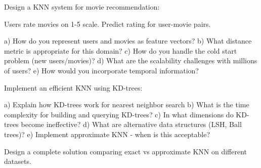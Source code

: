 \documentclass{article}
\newcounter{exercise}
\begin{document}
\begin{tcolorbox}[colback=gray!5!white,colframe=gray!75!black,title=Problem \stepcounter{exercise}: Real-world Application]

Design a KNN system for movie recommendation:

Users rate movies on 1-5 scale. Predict rating for user-movie pairs.

a) How do you represent users and movies as feature vectors?
b) What distance metric is appropriate for this domain?
c) How do you handle the cold start problem (new users/movies)?
d) What are the scalability challenges with millions of users?
e) How would you incorporate temporal information?
\end{tcolorbox}

\begin{tcolorbox}[colback=gray!5!white,colframe=gray!75!black,title=Problem \stepcounter{exercise}: Advanced Challenge]

Implement an efficient KNN using KD-trees:

a) Explain how KD-trees work for nearest neighbor search
b) What is the time complexity for building and querying KD-trees?
c) In what dimensions do KD-trees become ineffective?  
d) What are alternative data structures (LSH, Ball trees)?
e) Implement approximate KNN - when is this acceptable?

Design a complete solution comparing exact vs approximate KNN on different datasets.
\end{tcolorbox}
\end{document}
